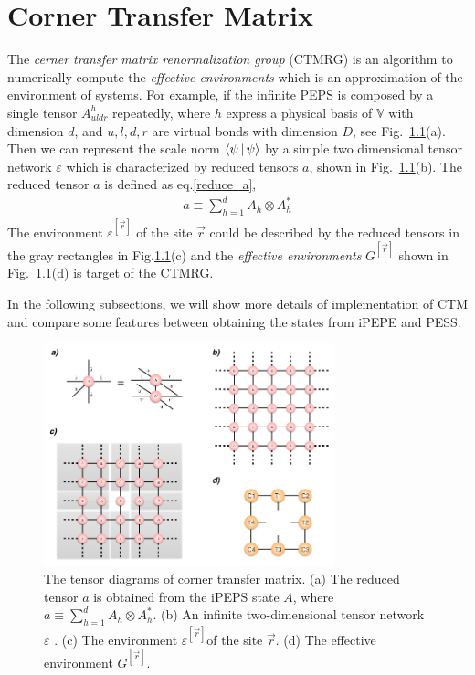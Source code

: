 \chapter{Corner Transfer Matrix}
\label{chapter:ctm}
The \textit{cerner transfer matrix renormalization group} (CTMRG) \cite{doi:10.1143/JPSJ.65.891} \cite{PhysRevB.80.094403} \cite{PhysRevB.84.041108} is an algorithm to numerically compute the \textit{effective environments} which is an approximation of the environment of systems. For example, if the infinite PEPS is composed by a single tensor $A^{h}_{uldr}$ repeatedly, where $h$ express a physical basis of  $\mathbb{V}$ with dimension $d$, and $u,l,d,r$ are virtual bonds with dimension $D$, see Fig.~\ref{fig501}(a). Then we can represent the scale norm $\Braket{\psi|\psi}$ by a simple two dimensional tensor network $\varepsilon$ which is characterized by reduced tensors $a$, shown in Fig.~\ref{fig501}(b). The reduced tensor $a$ is defined as eq.\ref{reduce_a}, 
\begin{align}
	\label{reduce_a}
	a \equiv \sum_{h=1}^{d} A_{h} \otimes A^{*}_{h}
\end{align}
The environment $\varepsilon^{[\vec{r}]}$ of the site $\vec{r}$ could be described by the reduced tensors in the gray rectangles in Fig.\ref{fig501}(c) and the \textit{effective environments} $G^{[\vec{r}]}$ shown in Fig.~\ref{fig501}(d) is target of the CTMRG. 

In the following subsections, we will show more details of implementation of CTM and compare some features between obtaining the states from iPEPE and PESS.

\begin{figure}[ht]
	\centering
	\includegraphics[width=0.75\textwidth]{figures/fig501.png}
	\caption[The tensor diagrams of the corner transfer matrix with the one-site unit cell.]{The tensor diagrams of corner transfer matrix. (a) The reduced tensor $a$ is obtained from the iPEPS state $A$, where $a \equiv \sum_{h=1}^{d} A_{h} \otimes A^{*}_{h}$. (b) An infinite two-dimensional tensor network $\varepsilon$ . (c) The environment $\varepsilon^{[\vec{r}]}$of the site $\vec{r}$. (d) The effective environment $G^{[\vec{r}]}$.}
	\label{fig501}
\end{figure}

